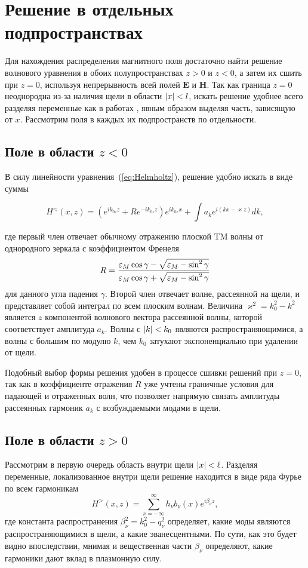 \section{Решение в отдельных подпространствах}
 Для нахождения распределения магнитного поля достаточно найти решение волнового уравнения в обоих полупространствах $z>0$ и $z<0$, а затем их сшить при $z = 0$, используя непрерывность всей полей $\mathbf{E}$ и $\mathbf{H}$. Так как граница $z=0$ неоднородна из-за наличия щели в области
 $\lvert x\rvert < l$, искать решение удобнее всего разделяя переменные как в работах \cite{sturman2010transmission,gorkunov2011transmission}, 
 явным образом выделяя часть, 
 зависящую от $x$. Рассмотрим поля в каждых их подпространств по отдельности.

 \subsection{Поле в области $z < 0$}
В силу линейности уравнения~(\ref{eq:Helmholtz}), решение удобно искать в виде суммы

\begin{equation}
  H^<(x,z) = (e^{i k_{0z} z} + R e^{-i k_{0z} z}) e^{i k_{0x} x} + \int a_k e^{i (k x - \varkappa z)} dk, 
\end{equation}

где первый член отвечает обычному отражению плоской TM волны от однородного зеркала с коэффициентом Френеля 
\[
 R = \frac{\varepsilon_M \cos{\gamma} - \sqrt{\varepsilon_M - \sin^2{\gamma}}}{\varepsilon_M \cos{\gamma} + \sqrt{\varepsilon_M - \sin^2{\gamma}}}
\]
для данного угла падения $\gamma$.  
Второй член отвечает волне, рассеянной на щели, и представляет собой интеграл по всем плоским волнам. Величина $\varkappa^2 = k_0^2-k^2$ является
$z$ компонентой волнового вектора рассеянной волны, которой соответствует амплитуда $a_k$. Волны с $\lvert k\rvert < k_0$ являются распространяющимися,
а волны с большим по модулю $k$, чем $k_0$ затухают экспоненциально при удалении от щели. 

Подобный выбор формы решения удобен в процессе сшивки решений при $z = 0$, так как в коэффициенте отражения $R$ уже учтены граничные условия для падающей и отраженных волн, что позволяет напрямую связать амплитуды рассеянных гармоник $a_k$ с возбуждаемыми модами в щели. 

\subsection{Поле в области $z>0$}
Рассмотрим в первую очередь область внутри щели $\lvert x\rvert<\ell$. Разделяя переменные, локализованное внутри щели решение 
находится в виде ряда Фурье по всем гармоникам 
\begin{equation}
H^>(x,z) = \sum_{\nu = -\infty}^{\infty} h_\nu b_\nu(x) e^{i \beta_{\nu} z},
  \label{eq:Fourier_series}
\end{equation}
где константа распространения $\beta_\nu^2 =  k_0^2-q_\nu^2 $ определяет, какие моды являются распространяющимися в щели, а какие эванесцентными.
По сути, как это будет видно впоследствии, мнимая и вещественная части $\beta_\nu$ определяют, какие гармоники дают вклад в плазмонную силу. 

